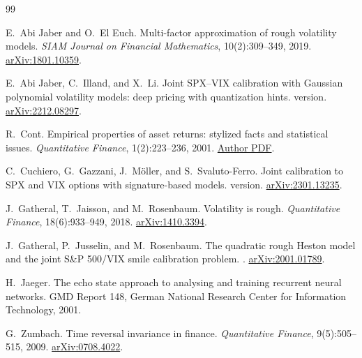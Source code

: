 \documentclass[11pt,a4paper]{article}
\begin{document}
\clearpage
\begin{thebibliography}{99}

E.~Abi Jaber and O.~El Euch.
\newblock Multi-factor approximation of rough volatility models.
\newblock \emph{SIAM Journal on Financial Mathematics}, 10(2):309--349, 2019.
\newblock \href{https://arxiv.org/abs/1801.10359}{arXiv:1801.10359}.

E.~Abi Jaber, C.~Illand, and X.~Li.
\newblock Joint SPX--VIX calibration with Gaussian polynomial volatility models:
deep pricing with quantization hints.
 version.
\newblock \href{https://arxiv.org/abs/2212.08297}{arXiv:2212.08297}.

R.~Cont.
\newblock Empirical properties of asset returns: stylized facts and statistical issues.
\newblock \emph{Quantitative Finance}, 1(2):223--236, 2001.
\newblock \href{https://rama.cont.perso.math.cnrs.fr/pdf/empirical.pdf}{Author PDF}.

C.~Cuchiero, G.~Gazzani, J.~M\"oller, and S.~Svaluto-Ferro.
\newblock Joint calibration to SPX and VIX options with signature-based models.
 version.
\newblock \href{https://arxiv.org/abs/2301.13235}{arXiv:2301.13235}.

J.~Gatheral, T.~Jaisson, and M.~Rosenbaum.
\newblock Volatility is rough.
\newblock \emph{Quantitative Finance}, 18(6):933--949, 2018.
\newblock \href{https://arxiv.org/abs/1410.3394}{arXiv:1410.3394}.

J.~Gatheral, P.~Jusselin, and M.~Rosenbaum.
\newblock The quadratic rough Heston model and the joint S\&P 500/VIX smile calibration
problem.
.
\newblock \href{https://arxiv.org/abs/2001.01789}{arXiv:2001.01789}.

H.~Jaeger.
\newblock The echo state approach to analysing and training recurrent neural networks.
\newblock GMD Report 148, German National Research Center for Information Technology, 2001.

G.~Zumbach.
\newblock Time reversal invariance in finance.
\newblock \emph{Quantitative Finance}, 9(5):505--515, 2009.
\newblock \href{https://arxiv.org/abs/0708.4022}{arXiv:0708.4022}.

\end{thebibliography}
\end{document}
